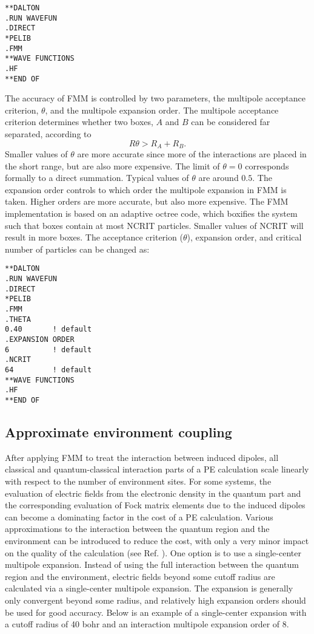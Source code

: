 \begin{verbatim}
**DALTON
.RUN WAVEFUN
.DIRECT
*PELIB
.FMM
**WAVE FUNCTIONS
.HF
**END OF
\end{verbatim}

The accuracy of FMM is controlled by two parameters, the multipole acceptance criterion, $\theta$,
and the multipole expansion order. The multipole acceptance criterion determines whether two 
boxes, $A$ and $B$ can be considered far separated, according to
\begin{equation}
R\theta > R_A + R_B.
\end{equation}
Smaller values of $\theta$ are more accurate since more of the interactions are placed in the 
short range, but are also more expensive. The limit of $\theta=0$ corresponds formally to a 
direct summation. Typical values of $\theta$ are around $0.5$.
The expansion order controls to which order the multipole expansion in FMM is taken. 
Higher orders are more accurate, but also more expensive.
The FMM implementation is based on an adaptive octree code, which boxifies the system such that
boxes contain at most NCRIT particles. Smaller values of NCRIT will result in more boxes.
The acceptance criterion ($\theta$), expansion order, and critical number of particles can be changed as:

\begin{verbatim}
**DALTON
.RUN WAVEFUN
.DIRECT
*PELIB
.FMM
.THETA
0.40       ! default
.EXPANSION ORDER
6          ! default
.NCRIT
64         ! default
**WAVE FUNCTIONS
.HF
**END OF
\end{verbatim}

\subsection{Approximate environment coupling}

After applying FMM to treat the interaction between induced dipoles, all classical and quantum-classical interaction parts of a PE calculation scale linearly with respect to the number of environment sites.
For some systems, the evaluation of electric fields from the electronic density in the quantum part and the corresponding evaluation of Fock matrix elements due to the induced dipoles can become a dominating factor in the cost of a PE calculation.
Various approximations to the interaction between the quantum region and the environment can be introduced to reduce the cost, with only a very minor impact on the quality of the calculation (see Ref. ).
One option is to use a single-center multipole expansion. Instead of using the full interaction between the quantum region and the environment, electric fields beyond some cutoff radius are calculated via a single-center multipole expansion.
The expansion is generally only convergent beyond some radius, and relatively high expansion orders should be used for good accuracy.
Below is an example of a single-center expansion with a cutoff radius of 40 bohr and an interaction multipole expansion order of 8.

